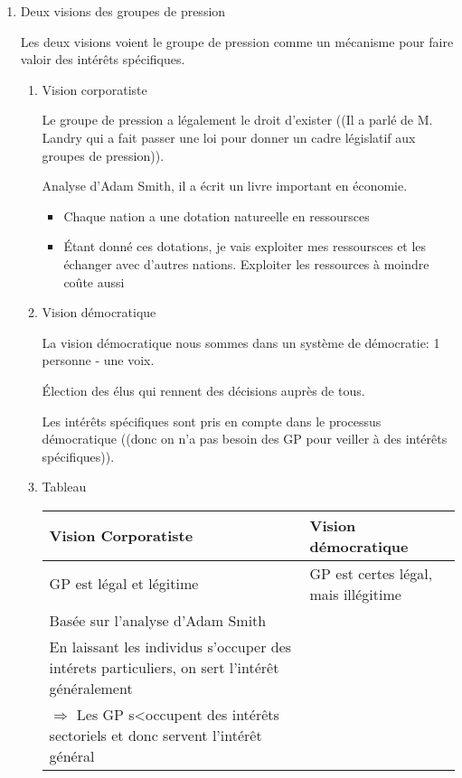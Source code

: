 \documentclass[11pt]{article}
\begin{document}
\begin{enumerate}
\begin{enumerate}
\begin{enumerate}
\begin{enumerate}
\item Deux visions des groupes de pression
\label{sec:org29795cc}

Les deux visions voient le groupe de pression comme un mécanisme pour faire
valoir des intérêts spécifiques.
\begin{enumerate}
\item Vision corporatiste
\label{sec:org175df10}

Le groupe de pression a légalement le droit d'exister ((Il a parlé de M. Landry
qui a fait passer une loi pour donner un cadre législatif aux groupes de
pression)).

Analyse d'Adam Smith, il a écrit un livre important en économie.
\begin{itemize}
\item Chaque nation a une dotation natureelle en ressoursces
\item Étant donné ces dotations, je vais exploiter mes ressoursces et les échanger
avec d'autres nations.  Exploiter les ressources à moindre coûte aussi
\end{itemize}

\item Vision démocratique
\label{sec:org7512f61}

La vision démocratique nous sommes dans un système de démocratie: 1 personne -
une voix.

Élection des élus qui  rennent des décisions auprès de tous.

Les intérêts spécifiques sont pris en compte dans le processus démocratique
((donc on n'a pas besoin des GP pour veiller à des intérêts spécifiques)).

\item Tableau
\label{sec:org4990c37}

\begin{center}
\begin{tabular}{ll}
Vision Corporatiste & Vision démocratique\\
\hline
GP est légal et légitime & GP est certes légal, mais illégitime\\
Basée sur l'analyse d'Adam Smith & \\
En laissant les individus s'occuper des intérets particuliers, on sert l'intérêt généralement & \\
\(\Rightarrow\) Les GP s<occupent des intérêts sectoriels et donc servent l'intérêt général & \\
\end{tabular}
\end{center}




\end{enumerate}
\end{enumerate}
\end{enumerate}
\end{enumerate}
\end{enumerate}
\end{document}
